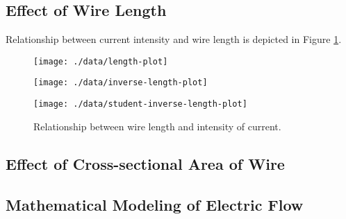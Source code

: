 \subsection{Effect of Wire Length}

Relationship between current intensity and wire length is depicted in Figure \ref{plot:length-current}.

\begin{figure}[!t]
  \centering
  \begin{subfloat}
    {
      \texttt{[image: ./data/length-plot]}
    }
  \end{subfloat}

  \begin{subfloat}[][Inverse of wire length-current data and linear regression model: $\frac{1}{y} = 0.0203x + 0.0416, R^2 = 0.725$. $y$ denotes current, $x$ denotes wire length in meters.]
    {
      \texttt{[image: ./data/inverse-length-plot]}
    }
  \end{subfloat}

  \hfill

  \begin{subfloat}
    {
      \texttt{[image: ./data/student-inverse-length-plot]}
    }
  \end{subfloat}

  \caption{Relationship between wire length and intensity of current.}
  \label{plot:length-current}
\end{figure}

\subsection{Effect of Cross-sectional Area of Wire}

\subsection{Mathematical Modeling of Electric Flow}
\label{subsection:derivation}
